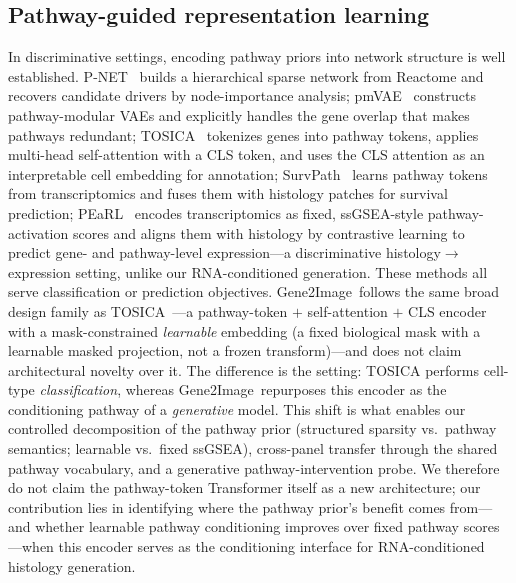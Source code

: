 \documentclass[journal]{IEEEtran}
\newcommand{\method}{Gene2Image}
\begin{document}
\subsection{Pathway-guided representation learning}
In discriminative settings, encoding pathway priors into network structure is
well established. P-NET~\cite{pnet} builds a hierarchical sparse network from
Reactome and recovers candidate drivers by node-importance analysis;
pmVAE~\cite{pmvae} constructs pathway-modular VAEs and explicitly handles the
gene overlap that makes pathways redundant; TOSICA~\cite{tosica} tokenizes genes
into pathway tokens, applies multi-head self-attention with a CLS token, and uses
the CLS attention as an interpretable cell embedding for annotation;
SurvPath~\cite{survpath} learns pathway tokens from transcriptomics and fuses them
with histology patches for survival prediction; PEaRL~\cite{pearl} encodes
transcriptomics as fixed, ssGSEA-style pathway-activation scores and aligns them with
histology by contrastive learning to predict gene- and pathway-level
expression---a discriminative histology$\to$expression setting, unlike our
RNA-conditioned generation. These methods all serve
classification or prediction objectives. \method\ follows the same broad design family as TOSICA~\cite{tosica}---a
pathway-token $+$ self-attention $+$ CLS encoder with a mask-constrained
\emph{learnable} embedding (a fixed biological mask with a learnable masked
projection, not a frozen transform)---and does not claim architectural novelty
over it. The difference is the
setting: TOSICA performs cell-type \emph{classification}, whereas \method\
repurposes this encoder as the conditioning pathway of a \emph{generative} model.
This shift is what enables our controlled decomposition of the pathway prior
(structured sparsity vs.\ pathway semantics; learnable vs.\ fixed ssGSEA),
cross-panel transfer through the shared pathway vocabulary, and a generative
pathway-intervention probe. We therefore do not claim the pathway-token
Transformer itself as a new architecture; our contribution lies in identifying
where the pathway prior's benefit comes from---and whether learnable pathway
conditioning improves over fixed pathway scores---when this encoder serves as the
conditioning interface for RNA-conditioned histology generation.
\end{document}
